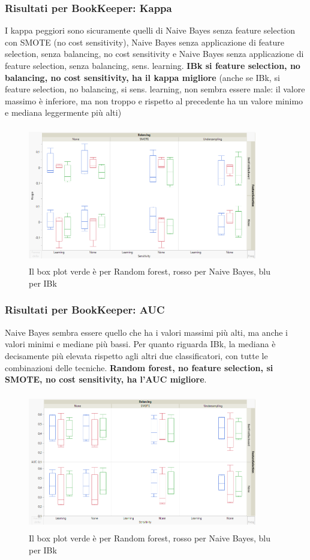 \documentclass{beamer}
\begin{document}
\begin{frame}
	\frametitle{Risultati per BookKeeper: Kappa}
	
	\fontsize{7pt}{8pt}\selectfont
	
	I kappa peggiori sono sicuramente quelli di Naive Bayes 
	senza feature selection con SMOTE (no cost sensitivity), Naive Bayes senza
	applicazione di feature selection, senza balancing, no cost sensitivity e 
	Naive Bayes senza applicazione di feature selection, senza balancing, sens.
	learning.
	\textbf{IBk si feature 
	selection, no balancing, no cost sensitivity, ha il kappa migliore} 
	(anche se IBk, si feature selection, no balancing, si sens. learning, 
	non sembra essere male: il valore massimo è inferiore, ma non troppo e
	rispetto al precedente ha un valore minimo e mediana leggermente più alti)
	
	\centering
	\begin{figure}
	\includegraphics[width=10cm, height=6cm]{bookkeeper-kappa}
	\caption{Il box plot verde è per Random forest, rosso per Naive Bayes, blu per IBk}
	\end{figure}
\end{frame}

\begin{frame}
	\frametitle{Risultati per BookKeeper: AUC}
	
	\fontsize{7pt}{8pt}\selectfont
	
	Naive Bayes sembra essere quello che ha i valori massimi più alti, ma anche i
	valori minimi e mediane più bassi.
	Per quanto riguarda IBk, la mediana è decisamente più elevata rispetto agli
	altri due classificatori, con tutte le combinazioni delle tecniche.
	\textbf{Random forest, no feature selection, si SMOTE, no cost sensitivity,
	ha l'AUC migliore}.
	
	\centering
	\begin{figure}
	\includegraphics[width=10cm, height=6cm]{bookkeeper-auc}
	\caption{Il box plot verde è per Random forest, rosso per Naive Bayes, blu per IBk}
	\end{figure}
\end{frame}
\end{document}
